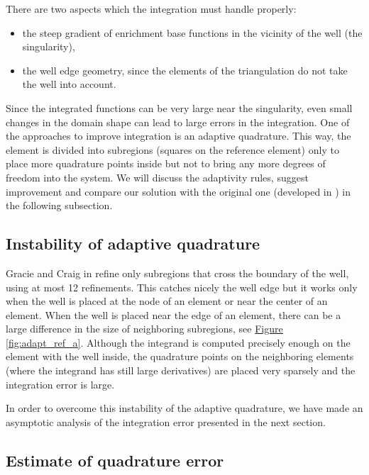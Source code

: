 \documentclass{elsarticle}
\newcommand{\fig}[1]{\hyperref[#1]{Figure \ref{#1}}}
\begin{document}
There are two aspects which the integration must handle properly:
\begin{itemize}
  \item the steep gradient of enrichment base functions in the vicinity of the well (the singularity),
  \item the well edge geometry, since the elements of the triangulation do not take the well into account.
\end{itemize}

Since the integrated functions can be very large near the singularity, even small changes in the domain shape 
can lead to large errors in the integration.
One of the approaches to improve integration is an adaptive quadrature. This way, the element is divided into 
subregions (squares on the reference element) only to place more quadrature points inside but not to bring 
any more degrees of freedom into the system. We will discuss the adaptivity rules, suggest improvement and 
compare our solution with the original one (developed in \cite{gracie_modelling_2010}) in the following subsection. 

\subsection{Instability of adaptive quadrature}
\label{sec:refinement_element}
Gracie and Craig in \cite{gracie_modelling_2010} refine only subregions that cross the boundary of the well, using at most 12 refinements.
This catches nicely the well edge but it works only when the well is placed at the node of an element or near the center of an element. 
When the well is placed near the edge of an element, there can be
a large difference in the size of neighboring subregions, see \fig{fig:adapt_ref_a}. Although
the integrand is computed precisely enough on the element with the well inside, the quadrature points on the
neighboring elements (where the integrand has still large derivatives) are placed very sparsely 
and the integration error is large.

In order to overcome this instability of the adaptive quadrature, we have made an asymptotic analysis of the integration error presented 
in the next section.

\subsection{Estimate of quadrature error}
\end{document}
